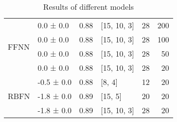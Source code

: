 \begin{table*}[h]
\begin{tabular}{llrlrr}
 \hline
\multirow{4}{*}{FFNN}         & 0.0 ± 0.0  &  0.88 & [15, 10, 3]    &         28 &      200 \\
         & 0.0 ± 0.0  &  0.88 & [15, 10, 3]    &         28 &      100 \\
         & 0.0 ± 0.0  &  0.88 & [15, 10, 3]    &         28 &       50 \\
         & 0.0 ± 0.0  &  0.88 & [15, 10, 3]    &         28 &       20 \\
 \hline
\multirow{3}{*}{RBFN}         & -0.5 ± 0.0 &  0.88 & [8, 4]         &         12 &       20 \\
         & -1.8 ± 0.0 &  0.89 & [15, 5]        &         20 &       20 \\
         & -1.8 ± 0.0 &  0.89 & [15, 10, 3]    &         28 &       20 \\
\hline
\end{tabular}
        \caption{Results of different models}
        \label{models}
    \end{table*}
    
